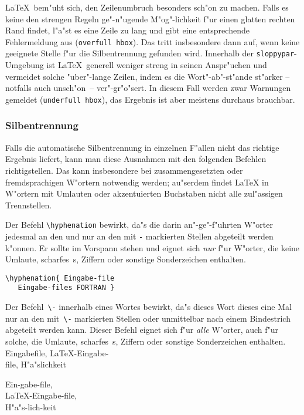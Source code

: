 \LaTeX\ bem"uht sich, den Zeilenumbruch besonders sch"on zu
machen.  Falls es keine den strengen Regeln ge"-n"ugende
M"og"-lichkeit f"ur einen glatten rechten Rand findet, l"a"st es
eine Zeile zu lang und gibt eine entsprechende Fehlermeldung aus
(\texttt{over\-full hbox}).
Das tritt insbesondere dann auf, wenn keine geeignete Stelle
f"ur die Silbentrennung gefunden wird.
Innerhalb der \texttt{sloppypar}-Umgebung ist \LaTeX\ generell
weniger streng in seinen Anspr"uchen und vermeidet solche
"uber"-lange Zeilen, indem es die Wort"-ab"-st"ande st"arker --
notfalls auch un\-sch"on~-- ver"-gr"o"sert.
In diesem Fall werden zwar Warnungen gemeldet (\texttt{under\-full
hbox}), das Ergebnis ist aber meistens durchaus brauchbar.
 
 
\subsubsection{Silbentrennung} \label{silb}
 
Falls die automatische Silbentrennung in einzelnen F"allen nicht
das richtige Ergebnis liefert, kann man diese Ausnahmen mit den
folgenden Befehlen richtigstellen.
Das kann insbesondere bei zusammengesetzten oder fremdsprachigen
W"ortern notwendig werden; au"serdem findet \LaTeX{} in W"ortern
mit Umlauten oder akzentuierten Buchstaben nicht alle zul"assigen
Trennstellen.
 
Der Befehl \verb|\hyphenation| bewirkt, da"s die darin
an"-ge"-f"uhrten W"orter jedesmal an den und nur an den mit
\verb|-| markierten Stellen abgeteilt werden k"onnen.
Er sollte im Vorspann stehen und eignet sich
\emph{nur} f"ur W"orter, die keine Umlaute, scharfes~s,
Ziffern oder sonstige Sonderzeichen enthalten.
%
\exa
~
\exb
\begin{verbatim}
\hyphenation{ Eingabe-file
   Eingabe-files FORTRAN }
\end{verbatim}
\exc
 
Der Befehl~\verb|\-| innerhalb eines Wortes bewirkt, da"s dieses
Wort dieses eine Mal nur an den mit~\verb|\-|
markierten Stellen 
oder unmittelbar nach einem Bindestrich
abgeteilt werden kann.
Dieser Befehl eignet sich f"ur \emph{alle} W"orter, auch f"ur
solche, die Umlaute, scharfes~s, Ziffern oder sonstige
Sonderzeichen enthalten.
\exa
Ein\-gabe\-file, \LaTeX-Eingabe-\\
file, H"a"s\-lich\-keit
\exb
\begin{flushleft}\ttfamily
Ein\bs-gabe\bs-file,\\
\bs{}LaTeX-Eingabe\bs-file,\\
H"a"s\bs-lich\bs-keit
\end{flushleft}
\exc


